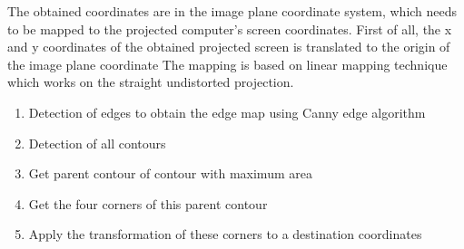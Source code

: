 \documentclass[12pt, a4paper]{article}
\begin{document}
    The obtained coordinates are in the image plane coordinate system, which needs to be mapped to the projected computer’s screen coordinates. First of all, the x and y coordinates of the obtained projected screen is translated to the origin of the image plane coordinate 
The mapping is based on linear mapping technique which works on the straight undistorted projection. 

\begin{enumerate}
\item Detection of edges to obtain the edge map using Canny edge algorithm
\item Detection of all contours
\item Get parent contour of contour with maximum area
\item Get the four corners of this parent contour
\item Apply the  transformation of these corners to a destination coordinates
\end{enumerate}
\end{document}
